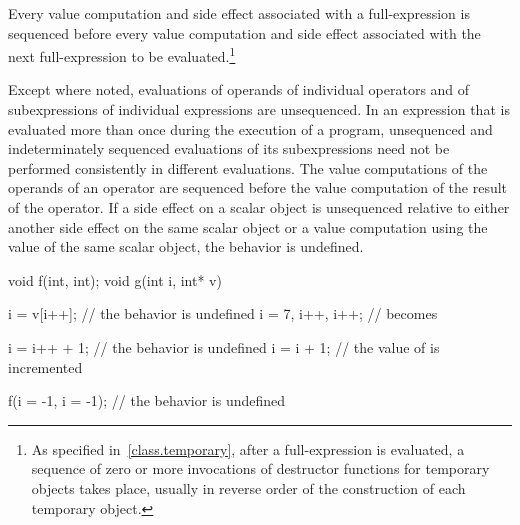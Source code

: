 \pnum
Every
%
value computation and
%
side effect associated with a full-expression is
sequenced before every value computation and side effect associated with the
next full-expression to be evaluated.\footnote{As specified
in~\ref{class.temporary}, after a full-expression is evaluated, a sequence of
zero or more invocations of destructor functions for temporary objects takes
place, usually in reverse order of the construction of each temporary object.}

\pnum
{}%
Except where noted, evaluations of operands of individual operators and
of subexpressions of individual expressions are unsequenced. \enternote
In an expression that is evaluated more than once during the execution
of a program, unsequenced and indeterminately sequenced evaluations of
its subexpressions need not be performed consistently in different
evaluations. \exitnote The value computations of the operands of an
operator are sequenced before the value computation of the result of the
operator. If a
%
side effect on a scalar object is unsequenced relative to
either another side effect on the same scalar object or a value
computation using the value of the same scalar object, the behavior is
undefined.

\enterexample

\begin{codeblock}
void f(int, int);
void g(int i, int* v) {
  i = v[i++];         // the behavior is undefined
  i = 7, i++, i++;    //  becomes 

  i = i++ + 1;        // the behavior is undefined
  i = i + 1;          // the value of  is incremented

  f(i = -1, i = -1);  // the behavior is undefined
}
\end{codeblock}
\exitexample

